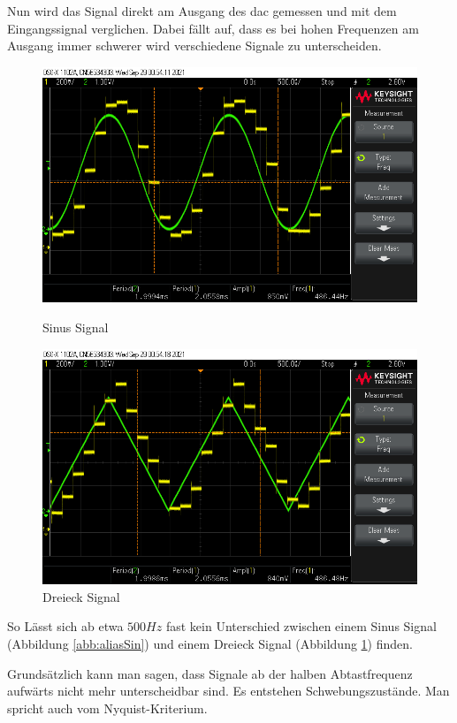 \documentclass[12pt, a4paper, ngerman]{article}
\begin{document}
Nun wird das Signal direkt am Ausgang des \ac{dac} gemessen und mit dem Eingangssignal verglichen.
Dabei fällt auf, dass es bei hohen Frequenzen am Ausgang immer schwerer wird verschiedene Signale zu unterscheiden.

\begin{figure}%
  \centering
  \begin{minipage}[b]{0.49\textwidth}
    \includegraphics[width=\textwidth]{scope_49.png}
    \caption{Sinus Signal}
    \label{abb:aliasSin}
  \end{minipage}
  \hfill
  \begin{minipage}[b]{0.49\textwidth}
    \includegraphics[width=\textwidth]{scope_50.png}
    \caption{Dreieck Signal}
    \label{abb:aliasTri}
  \end{minipage}
\end{figure}

So Lässt sich ab etwa $500Hz$ fast kein Unterschied
zwischen einem Sinus Signal (Abbildung \ref{abb:aliasSin})
und einem Dreieck Signal (Abbildung \ref{abb:aliasTri}) finden.

Grundsätzlich kann man sagen,
dass Signale ab der halben Abtastfrequenz aufwärts nicht mehr unterscheidbar sind.
Es entstehen Schwebungszustände. Man spricht auch vom Nyquist-Kriterium.
\end{document}
